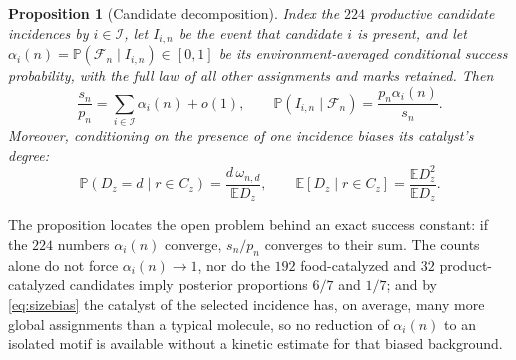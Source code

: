 \documentclass[11pt,letterpaper]{article}
\theoremstyle{plain}
\newtheorem{proposition}[theorem]{Proposition}
\theoremstyle{definition}
\theoremstyle{remark}
\numberwithin{equation}{section}
\newcommand{\PP}{\mathbb P}
\newcommand{\EE}{\mathbb E}
\newcommand{\cF}{\mathcal F}
\newcommand{\cI}{\mathcal I}
\begin{document}
\begin{proposition}[Candidate decomposition]\label{prop:decomposition}
Index the $224$ productive candidate incidences by $i\in\cI$, let $I_{i,n}$ be the event that candidate $i$ is present, and let $\alpha_i(n)=\PP(\cF_n\mid I_{i,n})\in[0,1]$ be its environment-averaged conditional success probability, with the full law of all other assignments and marks retained. Then
\begin{equation}\label{eq:decomposition}
 \frac{s_n}{p_n}=\sum_{i\in\cI}\alpha_i(n)+o(1),\qquad
 \PP(I_{i,n}\mid\cF_n)=\frac{p_n\alpha_i(n)}{s_n} .
\end{equation}
Moreover, conditioning on the presence of one incidence biases its catalyst's degree:
\begin{equation}\label{eq:sizebias}
 \PP(D_z=d\mid r\in C_z)=\frac{d\,\omega_{n,d}}{\EE D_z},\qquad
 \EE[D_z\mid r\in C_z]=\frac{\EE D_z^2}{\EE D_z} .
\end{equation}
\end{proposition}
The proposition locates the open problem behind an exact success constant: if the $224$ numbers $\alpha_i(n)$ converge, $s_n/p_n$ converges to their sum. The counts alone do not force $\alpha_i(n)\to1$, nor do the $192$ food-catalyzed and $32$ product-catalyzed candidates imply posterior proportions $6/7$ and $1/7$; and by \eqref{eq:sizebias} the catalyst of the selected incidence has, on average, many more global assignments than a typical molecule, so no reduction of $\alpha_i(n)$ to an isolated motif is available without a kinetic estimate for that biased background.
\end{document}
